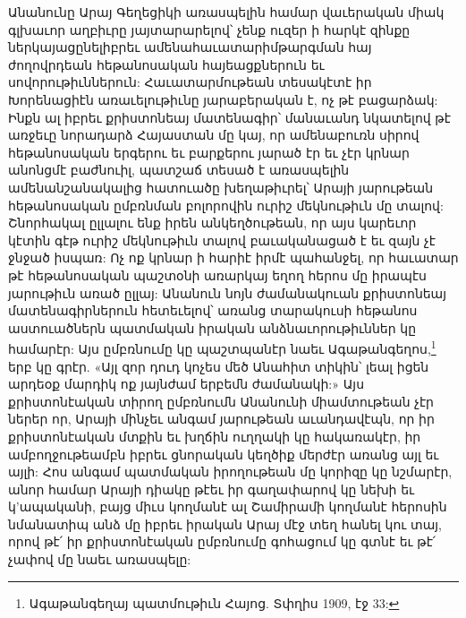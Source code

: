 \documentclass{article}
\begin{document}
{Անանունը Արայ Գեղեցիկի առասպելին համար վաւերական միակ գլխաւոր աղբիւրը յայտարարելով՝ չենք ուզեր ի հարկէ զինքը ներկայացընելիբրեւ ամենահաւատարիմթարգման հայ ժողովրդեան հեթանոսական հայեացքներուն եւ սովորութիւններուն: Հաւատարմութեան տեսակէտէ իր Խորենացիէն առաւելութիւնը յարաբերական է, ոչ թէ բացարձակ: Ինքն ալ իբրեւ քրիստոնեայ մատենագիր՝ մանաւանդ նկատելով թէ առջեւը նորադարձ Հայաստան մը կայ, որ ամենաբուռն սիրով հեթանոսական երգերու եւ բարքերու յարած էր եւ չէր կրնար անոնցմէ բաժնուիլ, պատշաճ տեսած է առասպելին ամենանշանակալից հատուածը խեղաթիւրել՝ Արայի յարութեան հեթանոսական ըմբռնման բոլորովին ուրիշ մեկնութիւն մը տալով: Շնորհակալ ըլլալու ենք իրեն անկեղծութեան, որ այս կարեւոր կէտին գէթ ուրիշ մեկնութիւն տալով բաւականացած է եւ զայն չէ ջնջած իսպառ: Ոչ ոք կրնար ի հարիէ իրմէ պահանջել, որ հաւատար թէ հեթանոսական պաշտօնի առարկայ եղող հերոս մը իրապէս յարութիւն առած ըլլայ: Անանուն նոյն ժամանակուան քրիստոնեայ մատենագիրներուն հետեւելով՝ առանց տարակուսի հեթանոս աստուածներն պատմական իրական անձնաւորութիւններ կը համարէր: Այս ըմբռնումը կը պաշտպանէր նաեւ Ագաթանգեղոս,\footnote{Ագաթանգեղայ պատմութիւն Հայոց. Տփղիս 1909, էջ 33:} երբ կը գրէր. «Այլ զոր դուդ կոչես մեծ Անահիտ տիկին՝ լեալ իցեն արդեօք մարդիկ ոք յայնժամ երբեմն ժամանակի:» Այս քրիստոնէական տիրող ըմբռնումն Անանունի միամտութեան չէր ներեր որ, Արայի մինչեւ անգամ յարութեան աւանդավէպն, որ իր քրիստոնէական մտքին եւ խղճին ուղղակի կը հակառակէր, իր ամբողջութեամբն իբրեւ ցնորական կեղծիք մերժէր առանց այլ եւ այլի: Հոս անգամ պատմական իրողութեան մը կորիզը կը նշմարէր, անոր համար Արայի դիակը թէեւ իր գաղափարով կը նեխի եւ կ'ապականի, բայց միւս կողմանէ ալ Շամիրամի կողմանէ հերոսին նմանատիպ անձ մը իբրեւ իրական Արայ մէջ տեղ հանել կու տայ, որով թէ՛ իր քրիստոնէական ըմբռնումը գոհացում կը գտնէ եւ թէ՛ չափով մը նաեւ առասպելը:

}
\end{document}
